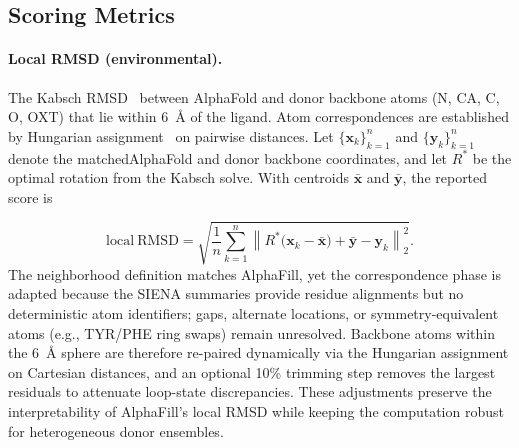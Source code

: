 \subsection{Scoring Metrics}\label{subsec:metrics}

\paragraph{Local RMSD (environmental).} The Kabsch RMSD~\cite{kabschSolutionBestRotation1976a, kabschDiscussionSolutionBest1978} between AlphaFold and donor backbone atoms (N, CA, C, O, OXT) that lie within 6~\AA{}
of the ligand. Atom correspondences are established by Hungarian assignment~\cite{kuhnHungarianMethodAssignment1955c,munkresAlgorithmsAssignmentTransportation1957} on pairwise distances. Let
\(\{\mathbf{x}_k\}_{k=1}^{n}\) and \(\{\mathbf{y}_k\}_{k=1}^{n}\)
denote the matchedAlphaFold and donor backbone coordinates, and let \(R^*\) be the optimal rotation from the Kabsch solve. With centroids \(\bar{\mathbf{x}}\) and \(\bar{\mathbf{y}}\), the reported score is

\begin{equation}
    \mathrm{local\ RMSD} = \sqrt{\frac{1}{n} \sum_{k=1}^{n} \left\| R^*\bigl(\mathbf{x}_k - \bar{\mathbf{x}}\bigr) + \bar{\mathbf{y}} - \mathbf{y}_k \right\|_2^2 }.
\end{equation}
The neighborhood definition matches AlphaFill, yet the correspondence phase is adapted because the SIENA summaries provide residue alignments but no deterministic atom identifiers; gaps, alternate locations, or symmetry-equivalent atoms (e.g., TYR/PHE ring swaps) remain unresolved. Backbone atoms within the 6~\AA{} sphere are therefore re-paired dynamically via the Hungarian assignment on Cartesian distances, and an optional 10\% trimming step removes the largest residuals to attenuate loop-state discrepancies. These adjustments preserve the interpretability of AlphaFill's local RMSD while keeping the computation robust for heterogeneous donor ensembles.

